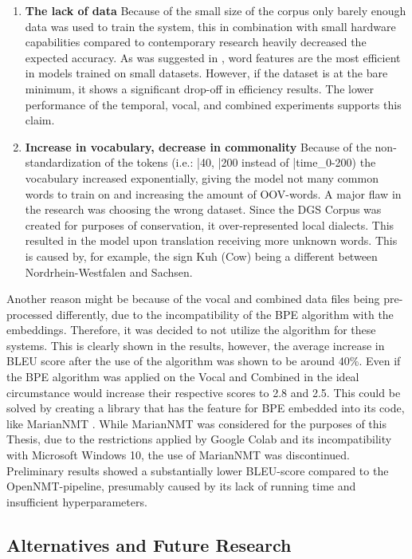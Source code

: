 \begin{enumerate}
    \item \textbf{The lack of data} Because of the small size of the corpus only barely enough data was used to train the system, this in combination with small hardware capabilities compared to contemporary research heavily decreased the expected accuracy. As was suggested in \citet{qi2018and}, word features are the most efficient in models trained on small datasets. However, if the dataset is at the bare minimum, it shows a significant drop-off in efficiency results. The lower performance of the temporal, vocal, and combined experiments supports this claim. 
    \item \textbf{Increase in vocabulary, decrease in commonality} Because of the non-standardization of the tokens (i.e.: |40, |200 instead of |time\_0-200) the vocabulary increased exponentially, giving the model not many common words to train on and increasing the amount of OOV-words. A major flaw in the research was choosing the wrong dataset. Since the DGS Corpus \cite{dgscorpus_3} was created for purposes of conservation, it over-represented local dialects. This resulted in the model upon translation receiving more unknown words. This is caused by, for example, the sign Kuh (Cow) being a different between Nordrhein-Westfalen and Sachsen.
\end{enumerate}

Another reason might be because of the vocal and combined data files being pre-processed differently, due to the incompatibility of the BPE algorithm with the embeddings. Therefore, it was decided to not utilize the algorithm for these systems. This is clearly shown in the results, however, the average increase in BLEU score after the use of the algorithm was shown to be around 40\%. Even if the BPE algorithm was applied on the Vocal and Combined in the ideal circumstance would increase their respective scores to 2.8 and 2.5. This could be solved by creating a library that has the feature for BPE embedded into its code, like MarianNMT \cite{mariannmt}. While MarianNMT was considered for the purposes of this Thesis, due to the restrictions applied by Google Colab and its incompatibility with Microsoft Windows 10, the use of MarianNMT was discontinued. Preliminary results showed a substantially lower BLEU-score compared to the OpenNMT-pipeline, presumably caused by its lack of running time and insufficient hyperparameters.

\subsection{Alternatives and Future Research}

